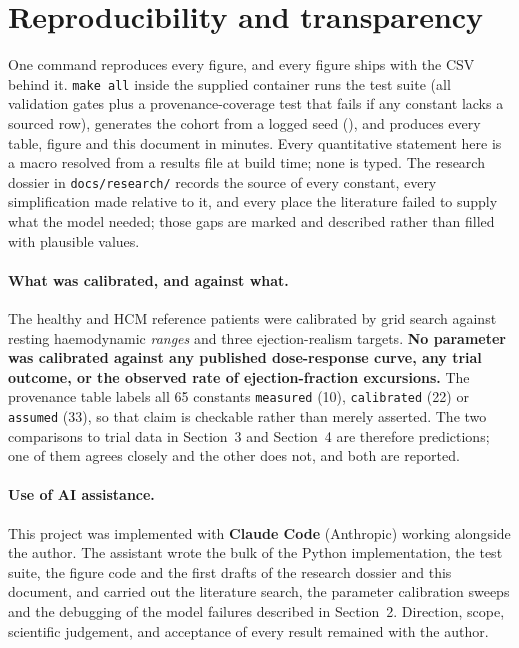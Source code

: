 \documentclass[11pt,a4paper]{article}
\newcommand{\claim}[1]{\textcolor{accent}{\textbf{#1}}}
\begin{document}
\section{Reproducibility and transparency}

One command reproduces every figure, and every figure ships with the CSV behind it.
\texttt{make all} inside the supplied container runs the test suite (all \nGates{} validation
gates plus a provenance-coverage test that fails if any constant lacks a sourced row),
generates the cohort from a logged seed (\seed), and produces every table, figure and this
document in \runtimeMinutes{} minutes. Every quantitative statement here is a macro resolved
from a results file at build time; none is typed. The research dossier in
\texttt{docs/research/} records the source of every constant, every simplification made
relative to it, and every place the literature failed to supply what the model needed; those
gaps are marked and described rather than filled with plausible values.

\paragraph{What was calibrated, and against what.} The healthy and HCM reference patients
were calibrated by grid search against resting haemodynamic \emph{ranges} and three
ejection-realism targets. \claim{No parameter was calibrated against any published
dose-response curve, any trial outcome, or the observed rate of ejection-fraction
excursions.} The provenance table labels all 65 constants \texttt{measured} (10),
\texttt{calibrated} (22) or \texttt{assumed} (33), so that claim is checkable rather than
merely asserted. The two comparisons to trial data in Section~3 and Section~4 are therefore
predictions; one of them agrees closely and the other does not, and both are reported.

\paragraph{Use of AI assistance.} This project was implemented with \textbf{Claude Code}
(Anthropic) working alongside the author. The assistant wrote the bulk of the Python
implementation, the test suite, the figure code and the first drafts of the research dossier
and this document, and carried out the literature search, the parameter calibration sweeps
and the debugging of the model failures described in Section~2. Direction, scope, scientific
judgement, and acceptance of every result remained with the author.
\end{document}
